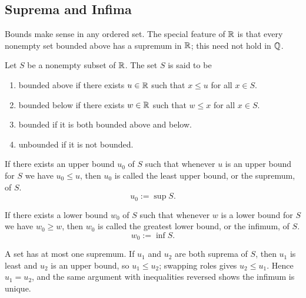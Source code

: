 \subsection{Suprema and Infima}
Bounds make sense in any ordered set. The special feature of $\mathbb{R}$ is that every nonempty set bounded above has a supremum in $\mathbb{R}$; this need not hold in $\mathbb{Q}$.

\begin{definition}
    \label{def:bounded-sets}
    Let $S$ be a nonempty subset of $\mathbb{R}$. The set $S$ is said to be
    \begin{enumerate}
        \item bounded above if there exists $u \in \mathbb{R}$ such that $x \leq u$ for all $x \in S$.
        \item bounded below if there exists $w \in \mathbb{R}$ such that $w \leq x$ for all $x \in S$.
        \item bounded if it is both bounded above and below.
        \item unbounded if it is not bounded.
    \end{enumerate}
\end{definition}

\begin{definition}
    [Supremum]\label{def:supremum}
    If there exists an upper bound $u_0$ of $S$ such that whenever $u$ is an upper bound for $S$
    we have $u_0 \leq u$, then $u_0$ is called the least upper bound, or the supremum, of $S$.
    \begin{equation*}
        u_0 := \sup S.
    \end{equation*}
\end{definition}

\begin{definition}
    [Infimum]\label{def:infimum}
    If there exists a lower bound $w_0$ of $S$ such that whenever $w$ is a lower bound for $S$
    we have $w_0 \geq w$, then $w_0$ is called the greatest lower bound, or the infimum, of $S$.
    \begin{equation*}
        w_0 := \inf S.
    \end{equation*}
\end{definition}


A set has at most one supremum. If $u_1$ and $u_2$ are both suprema of $S$, then $u_1$ is least and $u_2$ is an upper bound, so $u_1\leq u_2$; swapping roles gives $u_2\leq u_1$. Hence $u_1=u_2$, and the same argument with inequalities reversed shows the infimum is unique.

